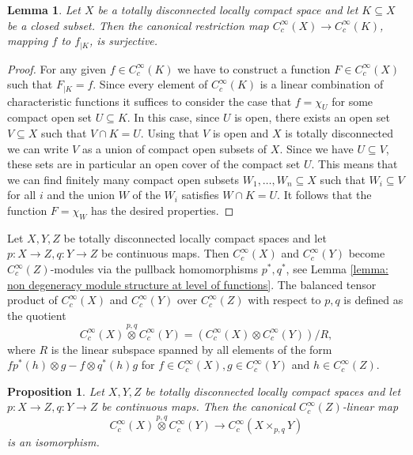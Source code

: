 \documentclass{amsart}
\newtheorem{lemma}[thm]{Lemma}
\newtheorem{prop}[thm]{Proposition}
\newcommand{\ccinfty}{C_c^\infty}
\begin{document}
\begin{lemma} \label{lemma:restriction is epimorphism}
Let $ X $ be a totally disconnected locally compact space and let $ K \subseteq X $ be a closed subset. Then the canonical restriction map $ \ccinfty(X) \rightarrow \ccinfty(K) $, mapping $ f $ to $ f_{\mid K} $, is surjective.
\end{lemma}

\begin{proof}
For any given $ f \in \ccinfty(K) $ we have to construct a function $ F \in \ccinfty(X) $ such that $ F_{|K} = f $. Since every element of $ \ccinfty(K) $ is a linear combination of characteristic functions it suffices to consider the case that $ f = \chi_U $ for some compact open set $ U \subseteq K $. In this case, since $ U $ is open, there exists an open set $ V \subseteq X $ such that $ V \cap K = U $. Using that $ V $ is open and $ X $ is totally disconnected we can write $ V $ as a union of compact open subsets of $ X $. Since we have $ U \subseteq V $, these sets are in particular an open cover of the compact set $ U $. This means that we can find finitely many compact open subsets $ W_1, \dots, W_n \subseteq X $ such that $ W_i \subseteq V $ for all $ i $ and the union $ W $ of the $ W_i $ satisfies $ W \cap K = U $. It follows that the function $ F = \chi_W $ has the desired properties.  
\end{proof}

Let $ X, Y, Z $ be totally disconnected locally compact spaces and let $  p: X \rightarrow Z, q: Y \rightarrow Z $ be continuous maps. Then $ \ccinfty(X) $ and $ \ccinfty(Y) $ become $ \ccinfty(Z) $-modules via the pullback homomorphisms $ p^*, q^* $, see Lemma \ref{lemma: non degeneracy module structure at level of functions}. The balanced tensor product of $ \ccinfty(X) $ and $ \ccinfty(Y) $ over $ \ccinfty(Z) $ with respect to $ p,q $ is defined as the quotient
$$
\ccinfty(X) \stackrel{p,q}{\otimes}\ccinfty(Y) = (\ccinfty(X) \otimes \ccinfty(Y))/R,
$$
where $ R $ is the linear subspace spanned by all elements of the form $ f p^*(h) \otimes g - f \otimes q^*(h) g $ for $ f \in \ccinfty(X), g \in \ccinfty(Y) $ 
and $ h \in \ccinfty(Z) $. 

\begin{prop} \label{prop:isomorphisms ccinfty}
Let $ X, Y, Z $ be totally disconnected locally compact spaces and let $ p: X \rightarrow Z, q: Y \rightarrow Z $ be continuous maps. Then the canonical $ \ccinfty(Z) $-linear map
$$
\ccinfty(X) \stackrel{p,q}{\otimes }\ccinfty(Y) \rightarrow \ccinfty(X \times_{p,q} Y) 
$$
is an isomorphism. 
\end{prop}
\end{document}
